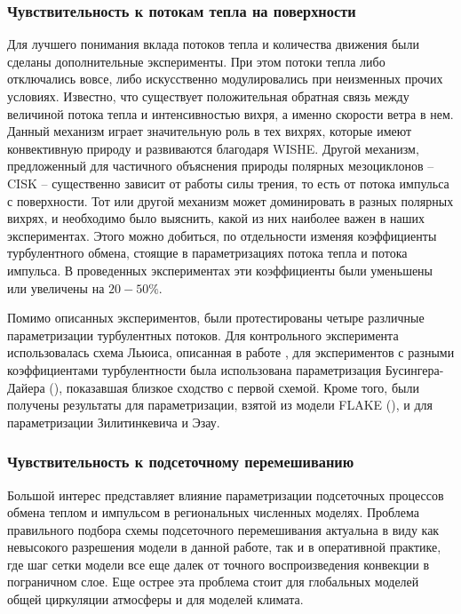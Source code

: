 \documentclass[12pt,a4paper]{report}
\begin{document}
\subsubsection{Чувствительность к потокам тепла на поверхности}
Для лучшего понимания вклада потоков тепла и количества движения были сделаны дополнительные эксперименты. При этом потоки тепла либо отключались вовсе, либо искусственно модулировались при неизменных прочих условиях. 
Известно, что существует положительная обратная связь между величиной потока тепла и интенсивностью вихря, а именно скорости ветра в нем. Данный механизм играет значительную роль в тех вихрях, которые имеют конвективную природу и развиваются благодаря WISHE. Другой механизм, предложенный  для частичного объяснения природы полярных мезоциклонов -- CISK -- существенно зависит от работы силы трения, то есть от потока импульса с поверхности. Тот или другой механизм может доминировать в разных полярных вихрях, и необходимо было выяснить, какой из них наиболее важен в наших экспериментах. Этого можно добиться, по отдельности изменяя коэффициенты турбулентного обмена, стоящие в параметризациях потока тепла и потока импульса. В проведенных экспериментах эти коэффициенты были уменьшены или увеличены на $20-50\%$.

Помимо описанных экспериментов, были протестированы четыре различные параметризации турбулентных потоков. Для контрольного эксперимента использовалась схема Льюиса, описанная в работе \citep{Louis1979}, для экспериментов с разными коэффициентами турбулентности была использована параметризация Бусингера-Дайера (\citep{MirandaPhD}), показавшая близкое сходство с первой схемой. Кроме того, были получены результаты для параметризации, взятой из модели FLAKE (\citep{Mironov2006}), и для параметризации Зилитинкевича и Эзау.

\subsubsection{Чувствительность к подсеточному перемешиванию}
Большой интерес представляет влияние параметризации подсеточных процессов обмена теплом и импульсом в региональных численных моделях. Проблема правильного подбора схемы подсеточного перемешивания актуальна в виду как невысокого разрешения модели в данной работе, так и в оперативной практике, где шаг сетки модели все еще далек от точного воспроизведения конвекции в пограничном слое. Еще острее эта проблема стоит для глобальных моделей общей циркуляции атмосферы и для моделей климата. 
\end{document}
